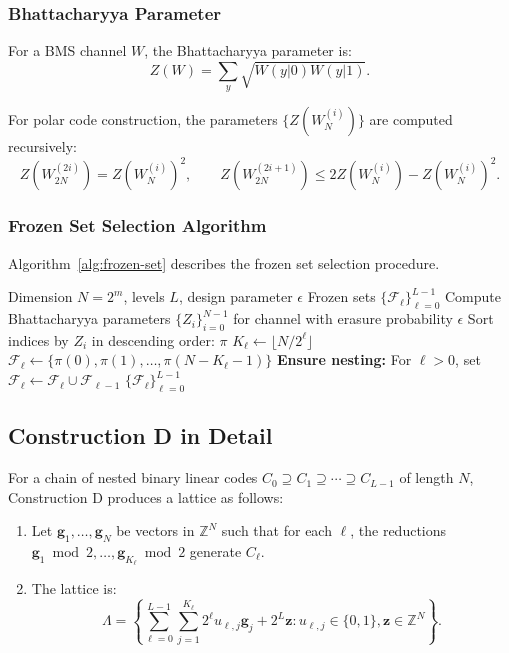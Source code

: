\documentclass[11pt,a4paper]{article}
\newcommand{\Z}{\mathbb{Z}}
\begin{document}
\subsubsection{Bhattacharyya Parameter}

For a BMS channel $W$, the Bhattacharyya parameter is:
\[
Z(W) = \sum_{y} \sqrt{W(y|0) W(y|1)}.
\]

For polar code construction, the parameters $\{Z(W_N^{(i)})\}$ are computed recursively:
\[
Z(W_{2N}^{(2i)}) = Z(W_N^{(i)})^2, \qquad Z(W_{2N}^{(2i+1)}) \leq 2Z(W_N^{(i)}) - Z(W_N^{(i)})^2.
\]

\subsubsection{Frozen Set Selection Algorithm}

Algorithm~\ref{alg:frozen-set} describes the frozen set selection procedure.

\begin{algorithm}[H]
\caption{$\mathsf{SelectFrozenSets}(N, L, \epsilon)$}
\label{alg:frozen-set}
\begin{algorithmic}[1]
\REQUIRE Dimension $N = 2^m$, levels $L$, design parameter $\epsilon$
\ENSURE Frozen sets $\{\mathcal{F}_\ell\}_{\ell=0}^{L-1}$
\STATE Compute Bhattacharyya parameters $\{Z_i\}_{i=0}^{N-1}$ for channel with erasure probability $\epsilon$
\STATE Sort indices by $Z_i$ in descending order: $\pi$
    \STATE $K_\ell \gets \lfloor N / 2^\ell \rfloor$
    \STATE $\mathcal{F}_\ell \gets \{\pi(0), \pi(1), \ldots, \pi(N - K_\ell - 1)\}$
\ENDFOR
\STATE \textbf{Ensure nesting:} For $\ell > 0$, set $\mathcal{F}_\ell \gets \mathcal{F}_\ell \cup \mathcal{F}_{\ell-1}$
\RETURN $\{\mathcal{F}_\ell\}_{\ell=0}^{L-1}$
\end{algorithmic}
\end{algorithm}

\subsection{Construction D in Detail}\label{app:construction-d}

For a chain of nested binary linear codes $C_0 \supseteq C_1 \supseteq \cdots \supseteq C_{L-1}$ of length $N$, Construction D produces a lattice as follows:

\begin{enumerate}[leftmargin=2em]
\item Let $\mathbf{g}_1, \ldots, \mathbf{g}_N$ be vectors in $\Z^N$ such that for each $\ell$, the reductions $\mathbf{g}_1 \bmod 2, \ldots, \mathbf{g}_{K_\ell} \bmod 2$ generate $C_\ell$.
\item The lattice is:
\[
\Lambda = \left\{\sum_{\ell=0}^{L-1} \sum_{j=1}^{K_\ell} 2^\ell u_{\ell,j} \mathbf{g}_j + 2^L \mathbf{z} : u_{\ell,j} \in \{0,1\}, \mathbf{z} \in \Z^N\right\}.
\]
\end{enumerate}
\end{document}
